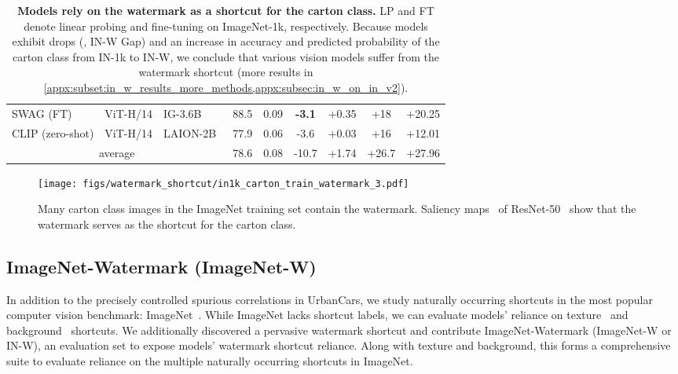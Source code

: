 \documentclass[10pt,twocolumn,letterpaper]{article}
\begin{document}
\begin{table*}[t]
\begin{adjustbox}{width=\linewidth}
\begin{tabular}{@{}lll|cc|cc|cc@{}}
SWAG (FT)    & ViT-H/14        & IG-3.6B                    & 88.5    &   0.09                  & \textbf{-3.1} & +0.35 & +18 & +20.25 \\
CLIP (zero-shot)    & ViT-H/14        & LAION-2B~\cite{schuhmann2022LAION5B}                    & 77.9      &   0.06                & -3.6 & +0.03  & +16    &  +12.01       \\ \midrule
\midrule
\multicolumn{3}{c|}{average}                 & 78.6      &   0.08                & -10.7 & +1.74  & +26.7    &  +27.96
\\ \bottomrule
\end{tabular}
\end{adjustbox}
\caption{\textbf{Models rely on the watermark as a shortcut for the carton class.} LP and FT denote linear probing and fine-tuning on ImageNet-1k, respectively. Because models exhibit drops (\ie, IN-W Gap) and an increase in accuracy and predicted probability of the carton class from IN-1k to IN-W, we conclude that various vision models suffer from the watermark shortcut (more results in \cref{appx:subset:in_w_results_more_methods,appx:subsec:in_w_on_in_v2}).}
\label{tab:watermark}
\vspace{-6mm}
\end{table*}

\begin{figure}[t]
  \centering
  \texttt{[image: figs/watermark\_shortcut/in1k\_carton\_train\_watermark\_3.pdf]}
   \caption{Many carton class images in the ImageNet training set contain the watermark. Saliency maps~\cite{selvaraju2017IEEEInt.Conf.Comput.Vis.ICCVGradCAM} of ResNet-50~\cite{he2016IEEEConf.Comput.Vis.PatternRecognit.CVPRDeep} show that the watermark serves as the shortcut for the carton class.}
   \label{fig:watermark_IN_1K_carton_train}
   \vspace{-6mm}
\end{figure}

\subsection{ImageNet-Watermark (ImageNet-W)}
\label{subsec:imagenet_watermark}


In addition to the precisely controlled spurious correlations in UrbanCars, we study naturally occurring shortcuts in the most popular computer vision benchmark: ImageNet~\cite{deng2009IEEEConf.Comput.Vis.PatternRecognit.CVPRImageNet}.
While ImageNet lacks shortcut labels, we can evaluate models' reliance on texture~\cite{geirhos2019Int.Conf.Learn.Represent.ImageNettrained} and background~\cite{xiao2021Int.Conf.Learn.Represent.Noise} shortcuts.
We additionally discovered a pervasive watermark shortcut and
contribute ImageNet-Watermark (ImageNet-W or IN-W), an evaluation set to expose models' watermark shortcut reliance. Along with texture and background, this forms a comprehensive suite
to evaluate reliance on the multiple naturally occurring shortcuts in ImageNet.
\end{document}
